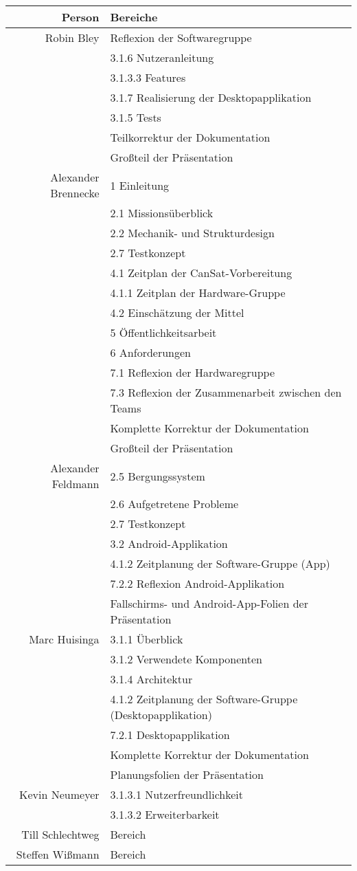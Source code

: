 \begin{table}[H]
	\centering
	\begin{tabular}{rl}
		\toprule
		\textbf{Person} & \textbf{Bereiche} \\
		\midrule
		Robin Bley & Reflexion der Softwaregruppe \\
		 & 3.1.6 Nutzeranleitung \\
		 & 3.1.3.3 Features \\
		 & 3.1.7 Realisierung der Desktopapplikation \\
		 & 3.1.5 Tests \\
		 & Teilkorrektur der Dokumentation \\
		 & Großteil der Präsentation \\
		Alexander Brennecke & 1 Einleitung  \\
		& 2.1 Missionsüberblick \\
		& 2.2 Mechanik- und Strukturdesign \\
		& 2.7 Testkonzept \\
		& 4.1 Zeitplan der CanSat-Vorbereitung \\
		& 4.1.1 Zeitplan der Hardware-Gruppe \\
		& 4.2 Einschätzung der Mittel \\
		& 5 Öffentlichkeitsarbeit \\
		& 6 Anforderungen \\
		& 7.1 Reflexion der Hardwaregruppe \\
		& 7.3 Reflexion der Zusammenarbeit zwischen den Teams \\
		& Komplette Korrektur der Dokumentation \\
		& Großteil der Präsentation \\
		Alexander Feldmann & 2.5 Bergungssystem \\
		 & 2.6 Aufgetretene Probleme \\
		 & 2.7 Testkonzept \\
		 & 3.2 Android-Applikation \\
		 & 4.1.2 Zeitplanung der Software-Gruppe (App) \\
		 & 7.2.2 Reflexion Android-Applikation \\
		 & Fallschirms- und Android-App-Folien der Präsentation \\
		Marc Huisinga & 3.1.1 Überblick \\
		 & 3.1.2 Verwendete Komponenten \\
		 & 3.1.4 Architektur \\
		 & 4.1.2 Zeitplanung der Software-Gruppe (Desktopapplikation) \\
		 & 7.2.1 Desktopapplikation \\
		 & Komplette Korrektur der Dokumentation \\
		 & Planungsfolien der Präsentation \\
		Kevin Neumeyer & 3.1.3.1 Nutzerfreundlichkeit \\
		 & 3.1.3.2 Erweiterbarkeit \\
		Till Schlechtweg & Bereich \\
		Steffen Wißmann & Bereich \\
		\bottomrule
	\end{tabular}
\end{table}

